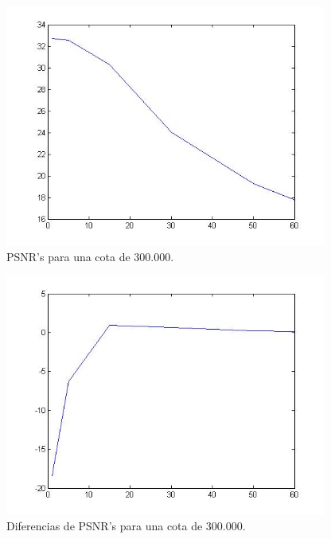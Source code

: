 \documentclass[10pt, a4paper]{article}
\begin{document}
\begin{itemize}
\begin{figure}[H] %
\begin{center}
\includegraphics[width=300pt]{./imgsPX300k.jpg}
\caption[h]{PSNR's para una cota de 300.000.}
\end{center}
\end{figure}


\begin{figure}[H] %
\begin{center}
\includegraphics[width=300pt]{./imgsPXY300k.jpg}
\caption[h]{Diferencias de PSNR's para una cota de 300.000.}
\end{center}
\end{figure}



\end{itemize}
\end{document}
